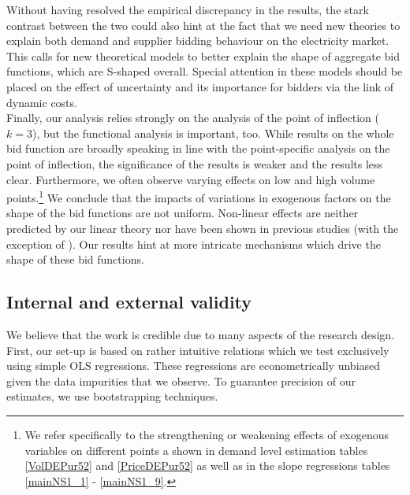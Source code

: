 Without having resolved the empirical discrepancy in the results, the stark contrast between the two could also hint at the fact that we need new theories to explain both demand and supplier bidding behaviour on the electricity market. This calls for new theoretical models to better explain the shape of aggregate bid functions, which are S-shaped overall. Special attention in these models should be placed on the effect of uncertainty and its importance for bidders via the link of dynamic costs. \\

Finally, our analysis relies strongly on the analysis of the point of inflection ($k=3$), but the functional analysis is important, too. While results on the whole bid function are broadly speaking in line with the point-specific analysis on the point of inflection, the significance of the results is weaker and the results less clear. Furthermore, we often observe varying effects on low and high volume points.\footnote{We refer specifically to the strengthening or weakening effects of exogenous variables on different points a shown in demand level estimation tables \ref{VolDEPur52} and \ref{PriceDEPur52} as well as in the slope regressions tables \ref{mainNS1_1} - \ref{mainNS1_9}.}
We conclude that the impacts of variations in exogenous factors on the shape of the bid functions are not uniform. Non-linear effects are neither predicted by our linear theory nor have been shown in previous studies (with the exception of \cite{wolfram1999measuring}). Our results hint at more intricate mechanisms which drive the shape of these bid functions. 

\subsection{Internal and external validity}
\label{internal}

We believe that the work is credible due to many aspects of the research design. \\

First, our set-up is based on rather intuitive relations which we test exclusively using simple OLS regressions. These regressions are econometrically unbiased given the data impurities that we observe. To guarantee precision of our estimates, we use bootstrapping techniques.\\ 

